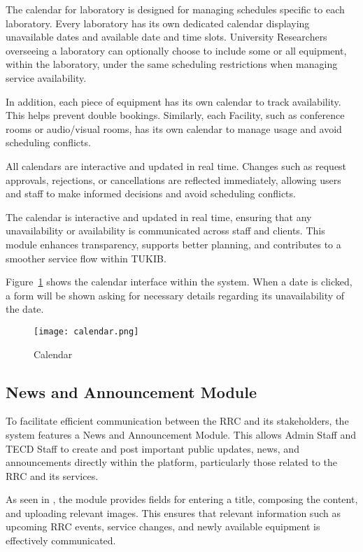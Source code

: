 The calendar for laboratory is designed for managing schedules specific to each laboratory. Every laboratory has its own dedicated calendar displaying unavailable dates and available date and time slots. University Researchers overseeing a laboratory can optionally choose to include some or all equipment, within the laboratory, under the same scheduling restrictions when managing service availability.

In addition, each piece of equipment has its own calendar to track availability. This helps prevent double bookings. Similarly, each Facility, such as conference rooms or audio/visual rooms, has its own calendar to manage usage and avoid scheduling conflicts.

All calendars are interactive and updated in real time. Changes such as request approvals, rejections, or cancellations are reflected immediately, allowing users and staff to make informed decisions and avoid scheduling conflicts.

The calendar is interactive and updated in real time, ensuring that any unavailability or availability is communicated across staff and clients. This module enhances transparency, supports better planning, and contributes to a smoother service flow within TUKIB.

Figure~\ref{fig:calendar} shows the calendar interface within the system. When a date is clicked, a form will be shown asking for necessary details regarding its unavailability of the date.\newline

\begin{figure}[h]
    \centering
    \texttt{[image: calendar.png]}
    \caption{Calendar}
    \label{fig:calendar}
\end{figure}

\newpage

\subsection{News and Announcement Module}

To facilitate efficient communication between the RRC and its stakeholders, the system features a News and Announcement Module. This allows Admin Staff and TECD Staff to create and post important public updates, news, and announcements directly within the platform, particularly those related to the RRC and its services.

As seen in , the module provides fields for entering a title, composing the content, and uploading relevant images. This ensures that relevant information such as upcoming RRC events, service changes, and newly available equipment is effectively communicated.\newline

